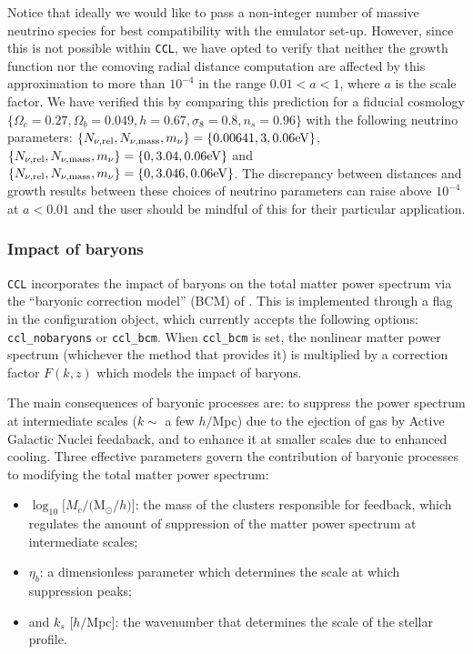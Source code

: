 \documentclass[\docopts]{\docclass}
\newcommand{\ccl}{{\tt CCL}\xspace}
\begin{document}
Notice that ideally we would like to pass a non-integer number of massive neutrino species for best compatibility with the emulator set-up. However, since this is not possible within {\tt CCL}, we have opted to verify that neither the growth function nor the comoving radial distance computation are affected by this approximation to more than $10^{-4}$ in the range $0.01<a<1$, where $a$ is the scale factor. We have verified this by comparing this prediction for a fiducial cosmology $\{\Omega_c=0.27,\Omega_b=0.049,h=0.67,\sigma_8=0.8,n_s=0.96\}$ with the following neutrino parameters: $\{N_{\nu,{\rm rel}},N_{\nu,{\rm mass}},m_{\nu}\}=\{0.00641,3,0.06{\rm eV}\}$, $\{N_{\nu,{\rm rel}},N_{\nu,{\rm mass}},m_{\nu}\}=\{0,3.04,0.06{\rm eV}\}$ and $\{N_{\nu,{\rm rel}},N_{\nu,{\rm mass}},m_{\nu}\}=\{0,3.046,0.06{\rm eV}\}$. The discrepancy between distances and growth results between these choices of neutrino parameters can raise above $10^{-4}$ at $a<0.01$ and the user should be mindful of this for their particular application.

\subsubsection{Impact of baryons}

\ccl incorporates the impact of baryons on the total matter power spectrum via the ``baryonic correction model'' (BCM) of \citet{Schneider15}. This is implemented through a flag in the configuration object, which currently accepts the following options: {\tt ccl\_nobaryons} or {\tt ccl\_bcm}. When {\tt ccl\_bcm} is set, the nonlinear matter power spectrum (whichever the method that provides it) is multiplied by a correction factor $F(k,z)$ which models the impact of baryons.

The main consequences of baryonic processes are: to suppress the power spectrum at intermediate scales ($k\sim$ a few $h/$Mpc) due to the ejection of gas by Active Galactic Nuclei feedaback, and to enhance it at smaller scales due to enhanced cooling. Three effective parameters govern the contribution of baryonic processes to modifying the total matter power spectrum:

\begin{itemize}
  \item $\log_{10} [M_c/($M$_\odot/h)]$: the mass of the clusters responsible for feedback, which regulates the amount of suppression of the matter power spectrum at intermediate scales;
  \item $\eta_b$: a dimensionless parameter which determines the scale at which suppression peaks;
  \item and $k_s$ [$h/$Mpc]: the wavenumber that determines the scale of the stellar profile.
\end{itemize}
\end{document}

